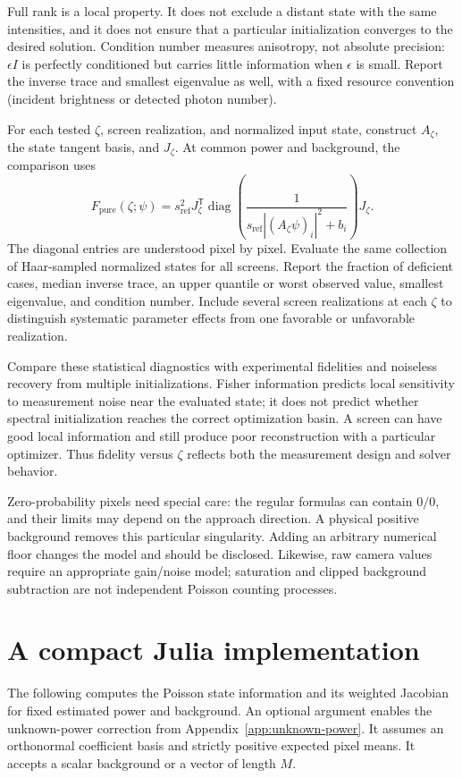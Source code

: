 \documentclass[11pt,a4paper]{article}
\newcommand{\diag}{\operatorname{diag}}
\begin{document}
Full rank is a local property. It does not exclude a distant state with the
same intensities, and it does not ensure that a particular initialization
converges to the desired solution. Condition number measures anisotropy,
not absolute precision: $\epsilon I$ is perfectly conditioned but carries
little information when $\epsilon$ is small. Report the inverse trace and
smallest eigenvalue as well, with a fixed resource convention (incident
brightness or detected photon number).

For each tested $\zeta$, screen realization, and normalized input state,
construct $A_\zeta$, the state tangent basis, and $J_\zeta$. At common
power and background, the comparison uses
\begin{equation}
 F_{\mathrm{pure}}(\zeta;\psi)
 =s_{\mathrm{ref}}^2J_\zeta^{\mathsf T}
 \diag\!\left(\frac{1}{s_{\mathrm{ref}}|(A_\zeta\psi)_i|^2+b_i}\right)
 J_\zeta.
\end{equation}
The diagonal entries are understood pixel by pixel. Evaluate the same
collection of Haar-sampled normalized states for all screens. Report the
fraction of deficient cases, median inverse trace, an upper quantile or
worst observed value, smallest eigenvalue, and condition number. Include
several screen realizations at each $\zeta$ to distinguish systematic
parameter effects from one favorable or unfavorable realization.

Compare these statistical diagnostics with experimental fidelities and
noiseless recovery from multiple initializations. Fisher information
predicts local sensitivity to measurement noise near the evaluated state;
it does not predict whether spectral initialization reaches the correct
optimization basin. A screen can have good local information and still
produce poor reconstruction with a particular optimizer. Thus fidelity
versus $\zeta$ reflects both the measurement design and solver behavior.

Zero-probability pixels need special care: the regular formulas can contain
$0/0$, and their limits may depend on the approach direction. A physical
positive background removes this particular singularity. Adding an arbitrary
numerical floor changes the model and should be disclosed. Likewise, raw
camera values require an appropriate gain/noise model; saturation and clipped
background subtraction are not independent Poisson counting processes.

\section{A compact Julia implementation}
The following computes the Poisson state information and its weighted
Jacobian for fixed estimated power and background. An optional argument
enables the unknown-power correction from Appendix~\ref{app:unknown-power}. It assumes
an orthonormal coefficient basis and strictly positive expected pixel means.
It accepts a scalar background or a vector of length $M$.
\end{document}
